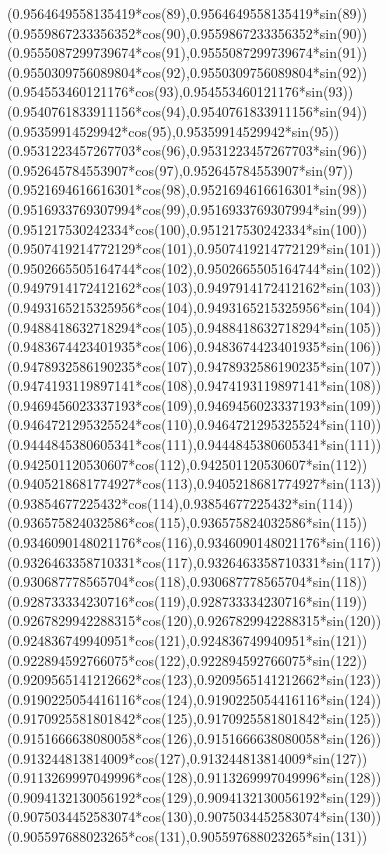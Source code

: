 {({0.9564649558135419*cos(89)},{0.9564649558135419*sin(89)})
({0.9559867233356352*cos(90)},{0.9559867233356352*sin(90)})
({0.9555087299739674*cos(91)},{0.9555087299739674*sin(91)})
({0.9550309756089804*cos(92)},{0.9550309756089804*sin(92)})
({0.954553460121176*cos(93)},{0.954553460121176*sin(93)})
({0.9540761833911156*cos(94)},{0.9540761833911156*sin(94)})
({0.95359914529942*cos(95)},{0.95359914529942*sin(95)})
({0.9531223457267703*cos(96)},{0.9531223457267703*sin(96)})
({0.952645784553907*cos(97)},{0.952645784553907*sin(97)})
({0.9521694616616301*cos(98)},{0.9521694616616301*sin(98)})
({0.9516933769307994*cos(99)},{0.9516933769307994*sin(99)})
({0.951217530242334*cos(100)},{0.951217530242334*sin(100)})
({0.9507419214772129*cos(101)},{0.9507419214772129*sin(101)})
({0.9502665505164744*cos(102)},{0.9502665505164744*sin(102)})
({0.9497914172412162*cos(103)},{0.9497914172412162*sin(103)})
({0.9493165215325956*cos(104)},{0.9493165215325956*sin(104)})
({0.9488418632718294*cos(105)},{0.9488418632718294*sin(105)})
({0.9483674423401935*cos(106)},{0.9483674423401935*sin(106)})
({0.9478932586190235*cos(107)},{0.9478932586190235*sin(107)})
({0.9474193119897141*cos(108)},{0.9474193119897141*sin(108)})
({0.9469456023337193*cos(109)},{0.9469456023337193*sin(109)})
({0.9464721295325524*cos(110)},{0.9464721295325524*sin(110)})
({0.9444845380605341*cos(111)},{0.9444845380605341*sin(111)})
({0.942501120530607*cos(112)},{0.942501120530607*sin(112)})
({0.9405218681774927*cos(113)},{0.9405218681774927*sin(113)})
({0.93854677225432*cos(114)},{0.93854677225432*sin(114)})
({0.936575824032586*cos(115)},{0.936575824032586*sin(115)})
({0.9346090148021176*cos(116)},{0.9346090148021176*sin(116)})
({0.9326463358710331*cos(117)},{0.9326463358710331*sin(117)})
({0.930687778565704*cos(118)},{0.930687778565704*sin(118)})
({0.928733334230716*cos(119)},{0.928733334230716*sin(119)})
({0.9267829942288315*cos(120)},{0.9267829942288315*sin(120)})
({0.924836749940951*cos(121)},{0.924836749940951*sin(121)})
({0.922894592766075*cos(122)},{0.922894592766075*sin(122)})
({0.9209565141212662*cos(123)},{0.9209565141212662*sin(123)})
({0.9190225054416116*cos(124)},{0.9190225054416116*sin(124)})
({0.9170925581801842*cos(125)},{0.9170925581801842*sin(125)})
({0.9151666638080058*cos(126)},{0.9151666638080058*sin(126)})
({0.913244813814009*cos(127)},{0.913244813814009*sin(127)})
({0.9113269997049996*cos(128)},{0.9113269997049996*sin(128)})
({0.9094132130056192*cos(129)},{0.9094132130056192*sin(129)})
({0.9075034452583074*cos(130)},{0.9075034452583074*sin(130)})
({0.905597688023265*cos(131)},{0.905597688023265*sin(131)})
}
